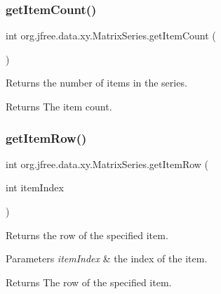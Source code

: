 \subsubsection{\texorpdfstring{get\+Item\+Count()}{getItemCount()}}
{\footnotesize\ttfamily int org.\+jfree.\+data.\+xy.\+Matrix\+Series.\+get\+Item\+Count (\begin{DoxyParamCaption}{ }\end{DoxyParamCaption})}

Returns the number of items in the series.

\begin{DoxyReturn}{Returns}
The item count. 
\end{DoxyReturn}
\mbox{\label{classorg_1_1jfree_1_1data_1_1xy_1_1_matrix_series_a86800fc58fce529793902f89f1beb816}} 
\subsubsection{\texorpdfstring{get\+Item\+Row()}{getItemRow()}}
{\footnotesize\ttfamily int org.\+jfree.\+data.\+xy.\+Matrix\+Series.\+get\+Item\+Row (\begin{DoxyParamCaption}\item[{int}]{item\+Index }\end{DoxyParamCaption})}

Returns the row of the specified item.


\begin{DoxyParams}{Parameters}
{\em item\+Index} & the index of the item.\\
\hline
\end{DoxyParams}
\begin{DoxyReturn}{Returns}
The row of the specified item. 
\end{DoxyReturn}
\mbox{\label{classorg_1_1jfree_1_1data_1_1xy_1_1_matrix_series_ac6e2e1491fbbc51fc0907f3769ee5da2}} 
